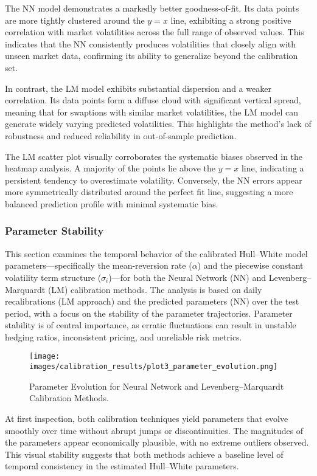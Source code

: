 The NN model demonstrates a markedly better goodness-of-fit. Its data points are more tightly clustered around the \(y=x\) line, exhibiting a strong positive correlation with market volatilities across the full range of observed values. This indicates that the NN consistently produces volatilities that closely align with unseen market data, confirming its ability to generalize beyond the calibration set.

In contrast, the LM model exhibits substantial dispersion and a weaker correlation. Its data points form a diffuse cloud with significant vertical spread, meaning that for swaptions with similar market volatilities, the LM model can generate widely varying predicted volatilities. This highlights the method’s lack of robustness and reduced reliability in out-of-sample prediction.

The LM scatter plot visually corroborates the systematic biases observed in the heatmap analysis. A majority of the points lie above the \(y=x\) line, indicating a persistent tendency to overestimate volatility. Conversely, the NN errors appear more symmetrically distributed around the perfect fit line, suggesting a more balanced prediction profile with minimal systematic bias.

\subsubsection{Parameter Stability}
This section examines the temporal behavior of the calibrated Hull–White model parameters—specifically the mean-reversion rate (\(\alpha\)) and the piecewise constant volatility term structure (\(\sigma_i\))—for both the Neural Network (NN) and Levenberg–Marquardt (LM) calibration methods. The analysis is based on daily recalibrations (LM approach) and the predicted parameters (NN) over the test period, with a focus on the stability  of the parameter trajectories. Parameter stability is of central importance, as erratic fluctuations can result in unstable hedging ratios, inconsistent pricing, and unreliable risk metrics.

\begin{figure}[H]
	\centering
	\texttt{[image: images/calibration\_results/plot3\_parameter\_evolution.png]}
	\caption{Parameter Evolution for Neural Network and Levenberg--Marquardt Calibration Methods.}
	\label{fig:parameter_evolution}
\end{figure}

At first inspection, both calibration techniques yield parameters that evolve smoothly over time without abrupt jumps or discontinuities. The magnitudes of the parameters appear economically plausible, with no extreme outliers observed. This visual stability suggests that both methods achieve a baseline level of temporal consistency in the estimated Hull--White parameters.

